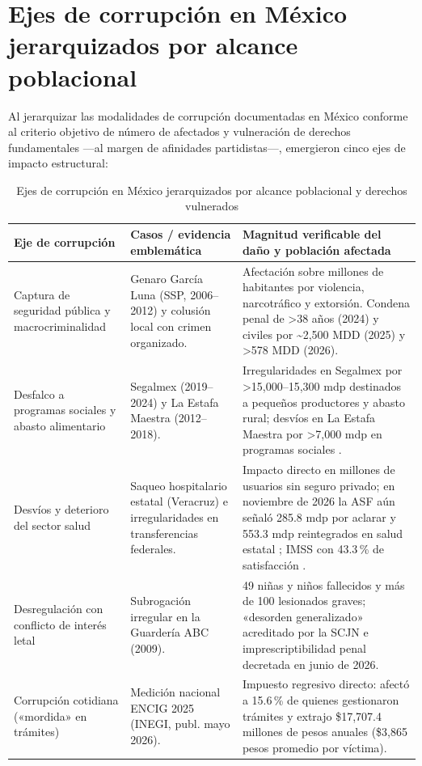 \section{Ejes de corrupción en México jerarquizados por alcance poblacional}

Al jerarquizar las modalidades de corrupción documentadas en México conforme al criterio objetivo de número de afectados y vulneración de derechos fundamentales ---al margen de afinidades partidistas---, emergieron cinco ejes de impacto estructural:

\begin{table}[H]
\centering
\caption{Ejes de corrupción en México jerarquizados por alcance poblacional y derechos vulnerados}
\label{tab:ejes_corrupcion}
\small
\begin{tabular}{@{}p{3.5cm}p{4cm}p{5.5cm}@{}}
\toprule
\textbf{Eje de corrupción} & \textbf{Casos / evidencia emblemática} & \textbf{Magnitud verificable del daño y población afectada} \\
\midrule
Captura de seguridad pública y macrocriminalidad & Genaro García Luna (SSP, 2006--2012) y colusión local con crimen organizado. & Afectación sobre millones de habitantes por violencia, narcotráfico y extorsión. Condena penal de >38 años (2024) y civiles por \textasciitilde2,500 MDD (2025) y >578 MDD (2026). \\
\addlinespace
Desfalco a programas sociales y abasto alimentario & Segalmex (2019--2024) y La Estafa Maestra (2012--2018). & Irregularidades en Segalmex por >15,000--15,300 mdp destinados a pequeños productores y abasto rural; desvíos en La Estafa Maestra por >7,000 mdp en programas sociales \citep{perez2024,mccitablero}. \\
\addlinespace
Desvíos y deterioro del sector salud & Saqueo hospitalario estatal (Veracruz) e irregularidades en transferencias federales. & Impacto directo en millones de usuarios sin seguro privado; en noviembre de 2026 la ASF aún señaló 285.8 mdp por aclarar y 553.3 mdp reintegrados en salud estatal \citep{ramos2026}; IMSS con 43.3\,\% de satisfacción \citep{inegi2026}. \\
\addlinespace
Desregulación con conflicto de interés letal & Subrogación irregular en la Guardería ABC (2009). & 49 niñas y niños fallecidos y más de 100 lesionados graves; «desorden generalizado» acreditado por la SCJN e imprescriptibilidad penal decretada en junio de 2026. \\
\addlinespace
Corrupción cotidiana («mordida» en trámites) & Medición nacional ENCIG 2025 (INEGI, publ. mayo 2026). & Impuesto regresivo directo: afectó a 15.6\,\% de quienes gestionaron trámites y extrajo \$17,707.4 millones de pesos anuales (\$3,865 pesos promedio por víctima). \\
\bottomrule
\end{tabular}
\end{table}